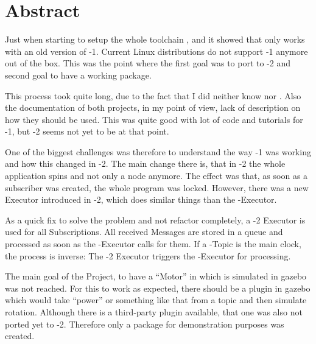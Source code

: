 
\section*{Abstract} \label{sec:abstract}

Just when starting to setup the whole toolchain ,  and  it showed that  only works with an old version of -1.
Current Linux distributions do not support -1 anymore out of the box.
This was the point where the first goal was to port  to -2 and second goal to have a working package.

This process took quite long, due to the fact that I did neither know  nor .
Also the documentation of both projects, in my point of view, lack of description on how they should be used.
This was quite good with lot of code and tutorials for -1, but -2 seems not yet to be at that point.

One of the biggest challenges was therefore to understand the way -1 was working and how this changed in -2.
The main change there is, that in -2 the whole application spins and not only a node anymore.
The effect was that, as soon as a subscriber was created, the whole  program was locked.
However, there was a new Executor introduced in -2, which does similar things than the -Executor.

As a quick fix to solve the problem and not refactor  completely, a -2 Executor is used for all Subscriptions.
All received Messages are stored in a queue and processed as soon as the -Executor calls for them.
If a -Topic is the main clock, the process is inverse: The -2 Executor triggers the -Executor for processing.

The main goal of the Project, to have a ``Motor'' in  which is simulated in \Gls{gazebo} was not reached.
For this to work as expected, there should be a plugin in \Gls{gazebo} which would take ``power'' or something like that from a topic and then simulate rotation.
Although there is a third-party plugin available, that one was also not ported yet to -2.
Therefore only a package for demonstration purposes was created.
